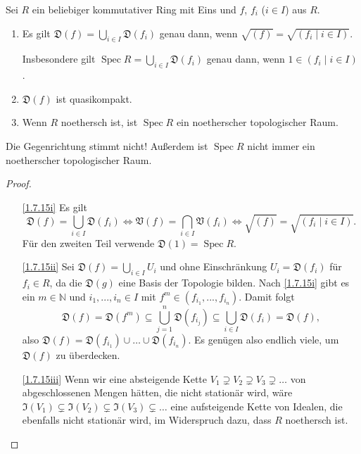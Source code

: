 \documentclass[a4paper,12pt,index=toc]{scrbook}
\theoremstyle{keinenummern} %
\def\V{\mathfrak{V}}
\def\I{\mathfrak{I}}
\newcommand{\D}{\mathfrak{D}}
\newcommand{\Spec}{\operatorname{Spec}}
\renewcommand{\dotsc}{\ensuremath{\!...}}
\newcommand{\set}[1]{\ensuremath{\mathbb{#1}}}
\newcommand{\N}{\set{N}}
\begin{document}
\begin{bem}\label{1.7.15}
  Sei $R$ ein beliebiger kommutativer Ring mit Eins und $f$, $f_i$ ($i\in I$) aus $R$.
  \begin{enumerate}
  \item{} Es gilt $\displaystyle \D(f)=\bigcup_{i\in I}\D(f_i)$ genau dann, wenn $\sqrt{(f)}=\sqrt{(f_i\mid i\in
      I)}$. 
      
      Insbesondere gilt $\displaystyle\Spec R=\bigcup_{i\in I}\D(f_i)$ genau dann, wenn $1\in(f_i\mid i\in I)$.
  \item{} $\D(f)$ ist quasikompakt.
  \item{} Wenn $R$ noethersch ist, ist $\Spec R$ ein noetherscher topologischer Raum.
  \end{enumerate}
\end{bem}

    \begin{w}
      Die Gegenrichtung stimmt nicht! Außerdem ist $\Spec R$ nicht immer ein noetherscher topologischer Raum.
    \end{w}

\begin{proof}
  \begin{enumerate}
  \item[\ref{1.7.15i}] Es gilt 
  \begin{equation*}\displaystyle \D(f)=\bigcup_{i\in I}\D(f_i) \iff \V(f)=\bigcap_{i\in I}\V(f_i) \iff
    \sqrt{(f)}=\sqrt{(f_i\mid i\in I)}.\end{equation*}
%
     Für den zweiten Teil verwende $\D(1)=\Spec R$.
  \item[\ref{1.7.15ii}] Sei $\D(f)=\bigcup_{i\in I} U_i$ und ohne Einschränkung $U_i=\D(f_i)$ für $f_i\in R$, da die $\D(g)$ eine
    Basis der Topologie bilden. Nach \ref{1.7.15i} gibt es ein $m\in\N$ und $i_1,\dotsc,i_n\in I$ mit
    $f^m\in(f_{i_1},\dotsc,f_{i_n})$. Damit folgt \begin{equation*} \D(f)=\D(f^m)\subseteq\bigcup_{j=1}^n \D(f_{i_j}) \subseteq\bigcup_{i\in I}
    \D(f_i) = \D(f), \end{equation*} also $\D(f)=\D(f_{i_1})\cup\dotso\cup \D(f_{i_n})$. Es genügen also endlich viele, um $\D(f)$ zu überdecken.
  \item[\ref{1.7.15iii}] Wenn wir eine absteigende Kette $V_1\supsetneq V_2\supsetneq V_3\supsetneq\dotso$ von abgeschlossenen
    Mengen hätten, die nicht stationär wird, wäre $\I(V_1)\subsetneq\I(V_2)\subsetneq\I(V_3)\subsetneq\dotso$ eine aufsteigende
    Kette von Idealen, die ebenfalls nicht stationär wird, im Widerspruch dazu, dass $R$ noethersch ist.
  \end{enumerate}
\end{proof}
\end{document}
